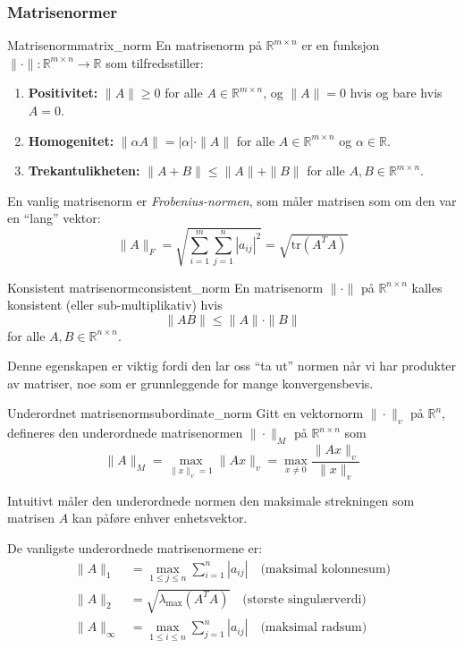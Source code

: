 \subsubsection{Matrisenormer}

\begin{definition}{Matrisenorm}{matrix_norm}
	En matrisenorm på $\mathbb{R}^{m \times n}$ er en funksjon $\|\cdot\| : \mathbb{R}^{m \times n} \to \mathbb{R}$ som tilfredsstiller:
	\begin{enumerate}
		\item \textbf{Positivitet:} $\|A\| \geq 0$ for alle $A \in \mathbb{R}^{m \times n}$, og $\|A\| = 0$ hvis og bare hvis $A = 0$.
		\item \textbf{Homogenitet:}
		      $\|\alpha A\| = |\alpha| \cdot \|A\|$ for alle $A \in \mathbb{R}^{m \times n}$ og $\alpha \in \mathbb{R}$.
		\item \textbf{Trekantulikheten:}
		      $\|A + B\| \leq \|A\| + \|B\|$ for alle $A,B \in \mathbb{R}^{m \times n}$.
	\end{enumerate}
\end{definition}

En vanlig matrisenorm er \emph{Frobenius-normen}, som måler matrisen som om den var en \enquote{lang} vektor:
\[
	\|A\|_F = \sqrt{\sum_{i=1}^m \sum_{j=1}^n |a_{ij}|^2} = \sqrt{\text{tr}(A^T A)}
\]

\begin{definition}{Konsistent matrisenorm}{consistent_norm}
	En matrisenorm $\|\cdot\|$ på $\mathbb{R}^{n \times n}$ kalles konsistent (eller sub-multiplikativ) hvis
	\[
		\|AB\| \leq \|A\| \cdot \|B\|
	\]
	for alle $A, B \in \mathbb{R}^{n \times n}$.
\end{definition}

Denne egenskapen er viktig fordi den lar oss \enquote{ta ut} normen når vi har produkter av matriser, noe som er grunnleggende for mange konvergensbevis.

\begin{definition}{Underordnet matrisenorm}{subordinate_norm}
	Gitt en vektornorm $\|\cdot\|_v$ på $\mathbb{R}^n$, defineres den underordnede matrisenormen $\|\cdot\|_M$ på $\mathbb{R}^{n \times n}$ som
	\[
		\|A\|_M = \max_{\|x\|_v = 1} \|Ax\|_v = \max_{x \neq 0} \frac{\|Ax\|_v}{\|x\|_v}
	\]
\end{definition}

Intuitivt måler den underordnede normen den maksimale strekningen som matrisen $A$ kan påføre enhver enhetsvektor.

De vanligste underordnede matrisenormene er:
\begin{align*}
	\|A\|_1      & = \max_{1 \leq j \leq n} \sum_{i=1}^n |a_{ij}| \quad \text{(maksimal kolonnesum)} \\
	\|A\|_2      & = \sqrt{\lambda_{\max}(A^T A)} \quad \text{(største singulærverdi)}               \\
	\|A\|_\infty & = \max_{1 \leq i \leq n} \sum_{j=1}^n |a_{ij}| \quad \text{(maksimal radsum)}
\end{align*}

